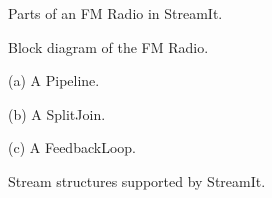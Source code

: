 \begin{figure}[t]
\begin{minipage}{3.3in}
\caption{Parts of an FM Radio in StreamIt.
\protect\label{fig:radiocode}}
\end{minipage}
\hspace{0.1in}
\begin{minipage}{3.1in}
\centering
{}
\caption{Block diagram of the FM Radio.
\protect\label{fig:radio-ascoded}}

\vspace{10pt}

(a) A Pipeline. \\
\vspace{10pt}

(b) A SplitJoin. \\
\vspace{10pt}

(c) A FeedbackLoop. \\
\caption{\protect\small Stream structures supported by StreamIt.
\protect\label{fig:structures}}
\end{minipage}
\end{figure}




  
